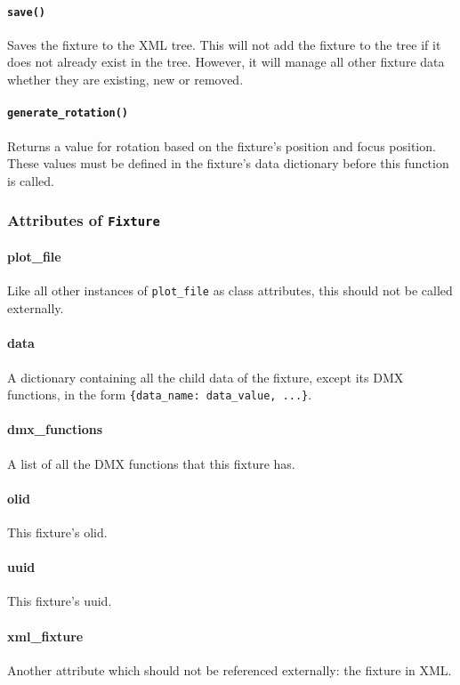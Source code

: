 \documentclass[a4paper]{article}
\begin{document}
\paragraph{\texttt{save()}}
Saves the fixture to the XML tree. This will not add the fixture to the tree 
if it does not already exist in the tree. However, it will manage all other 
fixture data whether they are existing, new or removed.

\paragraph{\texttt{generate\_rotation()}}
Returns a value for rotation based on the fixture's position and focus 
position. These values must be defined in the fixture's data dictionary 
before this function is called.

\subsubsection{Attributes of \texttt{Fixture}}

\paragraph{plot\_file}
Like all other instances of \texttt{plot\_file} as class attributes, this 
should not be called externally.

\paragraph{data}
A dictionary containing all the child data of the fixture, except its DMX 
functions, in the form \texttt{\{data\_name: data\_value, ...\}}.

\paragraph{dmx\_functions}
A list of all the DMX functions that this fixture has.

\paragraph{olid}
This fixture's olid.

\paragraph{uuid}
This fixture's uuid.

\paragraph{xml\_fixture}
Another attribute which should not be referenced externally: the fixture in 
XML.
\end{document}
